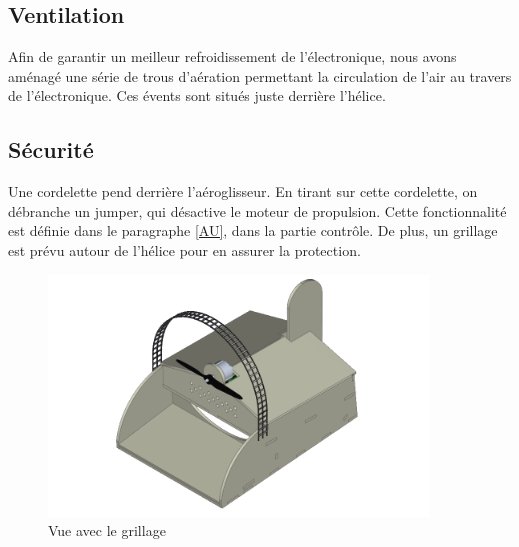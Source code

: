			\subsection{Ventilation}
			Afin de garantir un meilleur refroidissement de l'électronique, nous avons aménagé une série de trous d'aération permettant la circulation de l'air au travers de l'électronique. Ces évents sont situés juste derrière l'hélice.
			\subsection{Sécurité} Une cordelette pend derrière l'aéroglisseur. En tirant sur cette cordelette, on débranche un jumper, qui désactive le moteur de propulsion. Cette fonctionnalité est définie dans le paragraphe \ref{AU}, dans la partie contrôle. De plus, un grillage est prévu autour de l'hélice pour en assurer la protection.
			\begin{figure}[h]
					\begin{center}
						\includegraphics[width=0.9\textwidth]{../Illus/AeroProt.png}
					\end{center}
					\caption{Vue avec le grillage}
				\end{figure}
